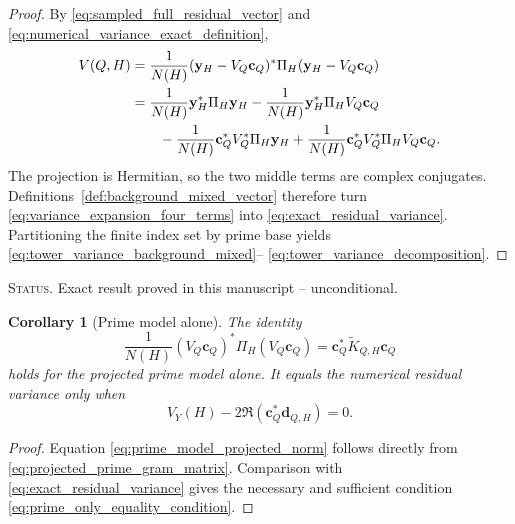 \documentclass[11pt]{amsart}
\numberwithin{equation}{section}
\theoremstyle{plain}
\newtheorem{corollary}[theorem]{Corollary}
\theoremstyle{definition}
\theoremstyle{remark}
\newcommand{\1}{\mathbf{1}}
\newcommand{\statusnote}[1]{%
  \par\smallskip\noindent
  \begingroup\footnotesize\textsc{Status.} #1\endgroup
  \par\smallskip}
\begin{document}
\begin{proof}
By \eqref{eq:sampled_full_residual_vector} and
\eqref{eq:numerical_variance_exact_definition},
\begin{align}
V(Q,H)
&=
\frac1{N(H)}
(\mathbf y_H-V_Q\mathbf c_Q)^\ast
\Pi_H
(\mathbf y_H-V_Q\mathbf c_Q)
\label{eq:variance_expansion_start}
\\
&=
\frac1{N(H)}\mathbf y_H^\ast\Pi_H\mathbf y_H
-
\frac1{N(H)}\mathbf y_H^\ast\Pi_HV_Q\mathbf c_Q
\notag
\\
&\qquad
-
\frac1{N(H)}\mathbf c_Q^\ast V_Q^\ast\Pi_H\mathbf y_H
+
\frac1{N(H)}\mathbf c_Q^\ast V_Q^\ast\Pi_HV_Q\mathbf c_Q.
\label{eq:variance_expansion_four_terms}
\end{align}
The projection is Hermitian, so the two middle terms are complex
conjugates.  Definitions~\ref{def:background_mixed_vector} therefore turn
\eqref{eq:variance_expansion_four_terms} into
\eqref{eq:exact_residual_variance}.  Partitioning the finite index set by
prime base yields \eqref{eq:tower_variance_background_mixed}--
\eqref{eq:tower_variance_decomposition}.
\end{proof}

\statusnote{Exact result proved in this manuscript -- unconditional.}
\begin{corollary}[Prime model alone]
\label{cor:prime_model_variance_only}
The identity
\begin{equation}
\frac1{N(H)}
(V_Q\mathbf c_Q)^\ast\Pi_H(V_Q\mathbf c_Q)
=
\mathbf c_Q^\ast\widetilde K_{Q,H}\mathbf c_Q
\label{eq:prime_model_projected_norm}
\end{equation}
holds for the projected prime model alone.  It equals the numerical
residual variance only when
\begin{equation}
V_Y(H)-2\Re(\mathbf c_Q^\ast\mathbf d_{Q,H})=0.
\label{eq:prime_only_equality_condition}
\end{equation}
\end{corollary}

\begin{proof}
Equation \eqref{eq:prime_model_projected_norm} follows directly from
\eqref{eq:projected_prime_gram_matrix}.  Comparison with
\eqref{eq:exact_residual_variance} gives the necessary and sufficient
condition \eqref{eq:prime_only_equality_condition}.
\end{proof}
\end{document}
